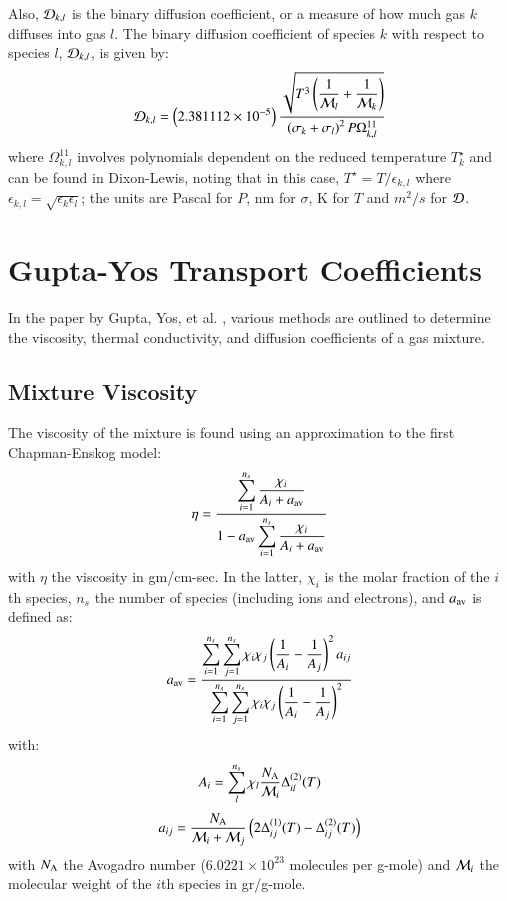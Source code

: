\documentclass{warpdoc}
\newcommand{\mfd}{\displaystyle}
\begin{document}
Also, ${\cal D}_{k,l}$ is the binary diffusion coefficient, or
a measure of how much gas $k$ diffuses into gas $l$. The binary diffusion coefficient of species $k$ with respect to species $l$,
${\cal D}_{k,l}$, is given by:
%
\begin{equation}
{\cal D}_{k,l}=\left( 2.381112 \times 10^{-5} \right) \frac{\sqrt{T^3 \mfd  \left(\frac{1}{{\cal M}_l} + \frac{1}{{\cal M}_k} \right)}}
              {  \left( \sigma_k + \sigma_l \right)^2 P \Omega^{11}_{k,l}}
\label{eqn:moldiff-binary}
\end{equation}
%
where $\Omega^{11}_{k,l}$ involves
polynomials dependent on the reduced temperature $T^\star_k$
and can be found in Dixon-Lewis, noting that in this case, $T^\star=T/\epsilon_{k,l}$
where $\epsilon_{k,l}=\sqrt{\epsilon_k \epsilon_l}$; the units are Pascal for $P$, nm for $\sigma$,
K for $T$ and $m^2/s$ for $\cal D$.


\section{Gupta-Yos Transport Coefficients}

In the paper by Gupta, Yos, et al. \cite{nasa:1990:gupta}, various methods are outlined to determine the viscosity, thermal conductivity, and diffusion coefficients of a gas mixture. 

\subsection{Mixture Viscosity}

The viscosity of the mixture is found using an approximation to the first Chapman-Enskog model:
%
\begin{equation}
    \eta=\frac{\mfd\sum_{i=1}^{n_s} \frac{\chi_i}{A_i+a_{\rm av}}}{\mfd 1- a_{\rm av}\sum_{i=1}^{n_s}\frac{\chi_i}{A_i + a_{\rm av}}}
\end{equation}
%
with $\eta$ the viscosity in gm/cm-sec. In the latter, $\chi_i$ is the molar fraction of the $i$th species, $n_s$ the number of species (including ions and electrons), and  $a_{\rm av}$ is defined as:
%
\begin{equation}
  a_{\rm av}=\frac{\mfd\sum_{i=1}^{n_s} \sum_{j=1}^{n_s} \chi_i \chi_j \left(\frac{1}{A_i}- \frac{1}{A_j} \right)^2 a_{ij}}{\mfd\sum_{i=1}^{n_s} \sum_{j=1}^{n_s} \chi_i \chi_j \left( \frac{1}{A_i} - \frac{1}{A_j}\right)^2}
\end{equation}
%
with:
%
\begin{equation}
    A_i= \sum_l^{n_s}  \chi_l \frac{N_{\rm A}}{{\cal M}_i} \Delta_{il}^{(2)}(T) 
\end{equation}
%
%
\begin{equation}
    a_{ij}=\frac{N_{\rm A}}{{\cal M}_i+{\cal M}_j}\left(2 \Delta_{ij}^{(1)}(T) - \Delta_{ij}^{(2)}(T) \right)
\end{equation}
%
with $N_{\rm A}$ the Avogadro number ($6.0221\times 10^{23}$ molecules per g-mole) and ${\cal M}_i$ the molecular weight of the $i$th species in gr/g-mole.
\end{document}
